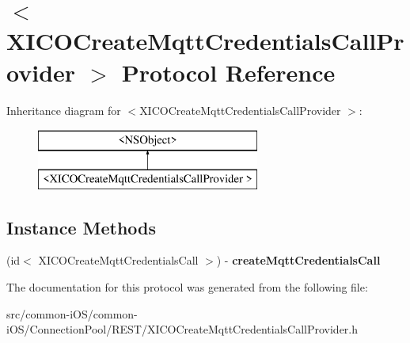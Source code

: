 \hypertarget{protocol_x_i_c_o_create_mqtt_credentials_call_provider_01-p}{}\section{$<$X\+I\+C\+O\+Create\+Mqtt\+Credentials\+Call\+Provider $>$ Protocol Reference}
\label{protocol_x_i_c_o_create_mqtt_credentials_call_provider_01-p}
Inheritance diagram for $<$X\+I\+C\+O\+Create\+Mqtt\+Credentials\+Call\+Provider $>$\+:\begin{figure}[H]
\begin{center}
\leavevmode
\includegraphics[height=2.000000cm]{protocol_x_i_c_o_create_mqtt_credentials_call_provider_01-p}
\end{center}
\end{figure}
\subsection*{Instance Methods}
\begin{DoxyCompactItemize}
\item 
\hypertarget{protocol_x_i_c_o_create_mqtt_credentials_call_provider_01-p_a376701ed35d04fa2b2faf8c7f8e55333}{}\label{protocol_x_i_c_o_create_mqtt_credentials_call_provider_01-p_a376701ed35d04fa2b2faf8c7f8e55333} 
(id$<$ X\+I\+C\+O\+Create\+Mqtt\+Credentials\+Call $>$) -\/ {\bfseries create\+Mqtt\+Credentials\+Call}
\end{DoxyCompactItemize}


The documentation for this protocol was generated from the following file\+:\begin{DoxyCompactItemize}
\item 
src/common-\/i\+O\+S/common-\/i\+O\+S/\+Connection\+Pool/\+R\+E\+S\+T/X\+I\+C\+O\+Create\+Mqtt\+Credentials\+Call\+Provider.\+h\end{DoxyCompactItemize}
